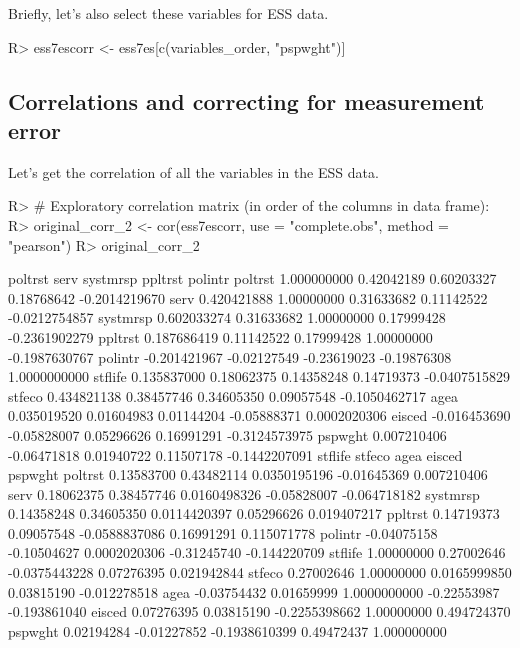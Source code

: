 \documentclass[
]{jss}
\begin{document}
Briefly, let's also select these variables for ESS data.

\begin{CodeChunk}

\begin{CodeInput}
R> ess7escorr <- ess7es[c(variables_order, "pspwght")]
\end{CodeInput}
\end{CodeChunk}

\hypertarget{correlations-and-correcting-for-measurement-error}{%
\subsection{Correlations and correcting for measurement
error}\label{correlations-and-correcting-for-measurement-error}}

Let's get the correlation of all the variables in the ESS data.

\begin{CodeChunk}

\begin{CodeInput}
R> # Exploratory correlation matrix (in order of the columns in data frame):
R> original_corr_2 <- cor(ess7escorr, use = "complete.obs", method = "pearson")
R> original_corr_2
\end{CodeInput}

\begin{CodeOutput}
              poltrst        serv    systmrsp     ppltrst       polintr
poltrst   1.000000000  0.42042189  0.60203327  0.18768642 -0.2014219670
serv      0.420421888  1.00000000  0.31633682  0.11142522 -0.0212754857
systmrsp  0.602033274  0.31633682  1.00000000  0.17999428 -0.2361902279
ppltrst   0.187686419  0.11142522  0.17999428  1.00000000 -0.1987630767
polintr  -0.201421967 -0.02127549 -0.23619023 -0.19876308  1.0000000000
stflife   0.135837000  0.18062375  0.14358248  0.14719373 -0.0407515829
stfeco    0.434821138  0.38457746  0.34605350  0.09057548 -0.1050462717
agea      0.035019520  0.01604983  0.01144204 -0.05888371  0.0002020306
eisced   -0.016453690 -0.05828007  0.05296626  0.16991291 -0.3124573975
pspwght   0.007210406 -0.06471818  0.01940722  0.11507178 -0.1442207091
             stflife      stfeco          agea      eisced      pspwght
poltrst   0.13583700  0.43482114  0.0350195196 -0.01645369  0.007210406
serv      0.18062375  0.38457746  0.0160498326 -0.05828007 -0.064718182
systmrsp  0.14358248  0.34605350  0.0114420397  0.05296626  0.019407217
ppltrst   0.14719373  0.09057548 -0.0588837086  0.16991291  0.115071778
polintr  -0.04075158 -0.10504627  0.0002020306 -0.31245740 -0.144220709
stflife   1.00000000  0.27002646 -0.0375443228  0.07276395  0.021942844
stfeco    0.27002646  1.00000000  0.0165999850  0.03815190 -0.012278518
agea     -0.03754432  0.01659999  1.0000000000 -0.22553987 -0.193861040
eisced    0.07276395  0.03815190 -0.2255398662  1.00000000  0.494724370
pspwght   0.02194284 -0.01227852 -0.1938610399  0.49472437  1.000000000
\end{CodeOutput}
\end{CodeChunk}
\end{document}
